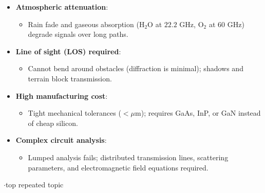 {\begin{itemize}
\begin{itemize}
  \end{itemize}
\end{itemize}
\begin{itemize}
  \item \textbf{Atmospheric attenuation}:
  \begin{itemize}
    \item Rain fade and gaseous absorption ($\text{H}_2\text{O}$ at $22.2\text{ GHz}$, $\text{O}_2$ at $60\text{ GHz}$) degrade signals over long paths.
  \end{itemize}
  \item \textbf{Line of sight (LOS) required}:
  \begin{itemize}
    \item Cannot bend around obstacles (diffraction is minimal); shadows and terrain block transmission.
  \end{itemize}
  \item \textbf{High manufacturing cost}:
  \begin{itemize}
    \item Tight mechanical tolerances ($<\mu\text{m}$); requires GaAs, InP, or GaN instead of cheap silicon.
  \end{itemize}
  \item \textbf{Complex circuit analysis}:
  \begin{itemize}
    \item Lumped analysis fails; distributed transmission lines, scattering parameters, and electromagnetic field equations required.
  \end{itemize}
\end{itemize}}

\vspace{2pt}


{\color{sub}\footnotesize {}  \gap$\cdot$\gap top repeated topic}

